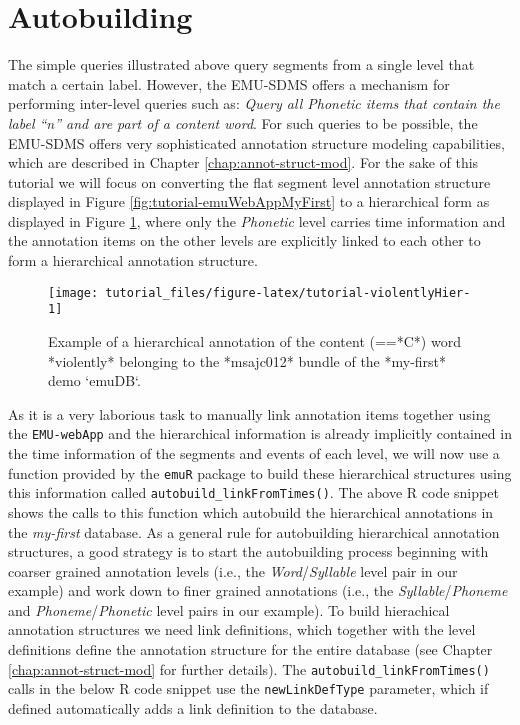 \documentclass[
]{book}
\begin{document}
\hypertarget{autobuilding}{%
\section{Autobuilding}\label{autobuilding}}

The simple queries illustrated above query segments from a single level that match a certain label. However, the EMU-SDMS offers a mechanism for performing inter-level queries such as: \emph{Query all Phonetic items that contain the label ``n'' and are part of a content word}. For such queries to be possible, the EMU-SDMS offers very sophisticated annotation structure modeling capabilities, which are described in Chapter \ref{chap:annot-struct-mod}. For the sake of this tutorial we will focus on converting the flat segment level annotation structure displayed in Figure \ref{fig:tutorial-emuWebAppMyFirst} to a hierarchical form as displayed in Figure \ref{fig:tutorial-violentlyHier}, where only the \emph{Phonetic} level carries time information and the annotation items on the other levels are explicitly linked to each other to form a hierarchical annotation structure.

\begin{figure}

{\centering \texttt{[image: tutorial\_files/figure-latex/tutorial-violentlyHier-1]} 

}

\caption{Example of a hierarchical annotation of the content (==*C*) word *violently* belonging to the *msajc012* bundle of the *my-first* demo `emuDB`.}\label{fig:tutorial-violentlyHier}
\end{figure}

As it is a very laborious task to manually link annotation items together using the \texttt{EMU-webApp} and the hierarchical information is already implicitly contained in the time information of the segments and events of each level, we will now use a function provided by the \texttt{emuR} package to build these hierarchical structures using this information called \texttt{autobuild\_linkFromTimes()}. The above R code snippet shows the calls to this function which autobuild the hierarchical annotations in the \emph{my-first} database. As a general rule for autobuilding hierarchical annotation structures, a good strategy is to start the autobuilding process beginning with coarser grained annotation levels (i.e., the \emph{Word}/\emph{Syllable} level pair in our example) and work down to finer grained annotations (i.e., the \emph{Syllable}/\emph{Phoneme} and \emph{Phoneme}/\emph{Phonetic} level pairs in our example). To build hierachical annotation structures we need link definitions, which together with the level definitions define the annotation structure for the entire database (see Chapter \ref{chap:annot-struct-mod} for further details). The \texttt{autobuild\_linkFromTimes()} calls in the below R code snippet use the \texttt{newLinkDefType} parameter, which if defined automatically adds a link definition to the database.
\end{document}
